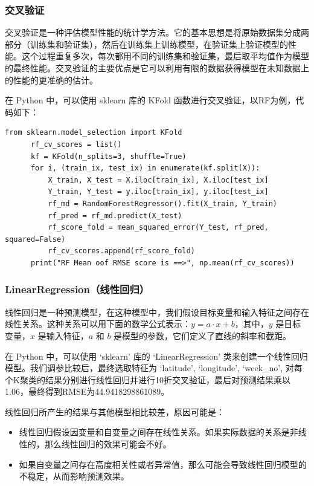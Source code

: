 \documentclass{ctexart}
\begin{document}
\subsubsection{交叉验证}

交叉验证是一种评估模型性能的统计学方法。它的基本思想是将原始数据集分成两部分（训练集和验证集），然后在训练集上训练模型，在验证集上验证模型的性能。这个过程重复多次，每次都用不同的训练集和验证集，最后取平均值作为模型的最终性能。交叉验证的主要优点是它可以利用有限的数据获得模型在未知数据上的性能的更准确的估计。

在 Python 中，可以使用 sklearn 库的 KFold 函数进行交叉验证，以RF为例，代码如下：

\begin{lstlisting}[style=Python]
      from sklearn.model_selection import KFold
      rf_cv_scores = list()
      kf = KFold(n_splits=3, shuffle=True)
      for i, (train_ix, test_ix) in enumerate(kf.split(X)):
          X_train, X_test = X.iloc[train_ix], X.iloc[test_ix]
          Y_train, Y_test = y.iloc[train_ix], y.iloc[test_ix]
          rf_md = RandomForestRegressor().fit(X_train, Y_train)
          rf_pred = rf_md.predict(X_test)
          rf_score_fold = mean_squared_error(Y_test, rf_pred, squared=False)
          rf_cv_scores.append(rf_score_fold)
      print("RF Mean oof RMSE score is ==>", np.mean(rf_cv_scores))
\end{lstlisting}

\subsubsection{LinearRegression（线性回归）}

线性回归是一种预测模型，在这种模型中，我们假设目标变量和输入特征之间存在线性关系。这种关系可以用下面的数学公式表示：\(y = a \cdot x + b\)，其中，\(y\) 是目标变量，\(x\) 是输入特征，\(a\) 和 \(b\) 是模型的参数，它们定义了直线的斜率和截距。

在 Python 中，可以使用 `sklearn' 库的 `LinearRegression' 类来创建一个线性回归模型。我们调参比较后，最终选取特征为 `latitude', `longitude', `week\_no', 对每个K聚类的结果分别进行线性回归并进行10折交叉验证，最后对预测结果乘以1.06，最终得到RMSE为44.9418298861089。

线性回归所产生的结果与其他模型相比较差，原因可能是：

\begin{itemize}
      \item 线性回归假设因变量和自变量之间存在线性关系。如果实际数据的关系是非线性的，那么线性回归的效果可能会不好。
      \item 如果自变量之间存在高度相关性或者异常值，那么可能会导致线性回归模型的不稳定，从而影响预测效果。
\end{itemize}
\end{document}

